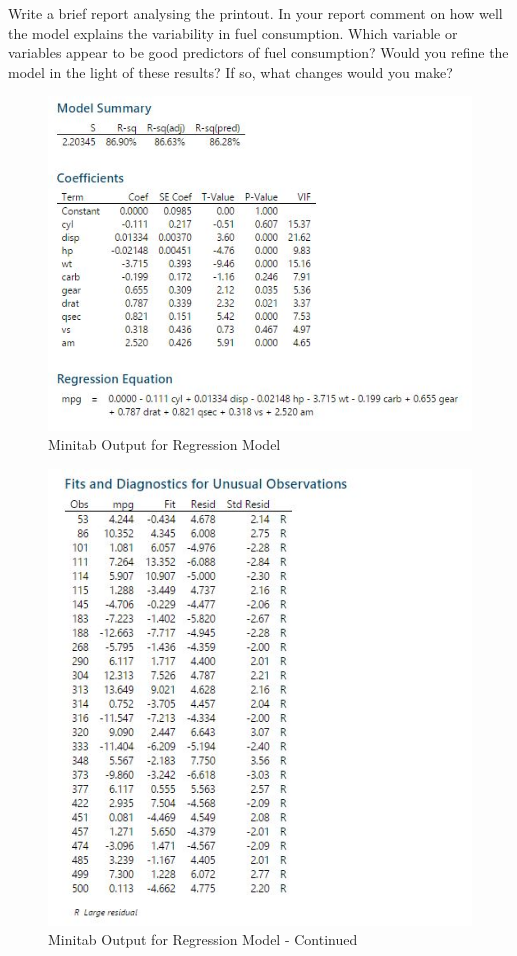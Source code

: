 \documentclass[a4paper,12pt]{article}
\begin{document}
\noindent Write a brief report analysing the printout. In your report comment on how well
the model explains the variability in fuel consumption.
Which variable or variables appear to be good predictors of fuel consumption?
Would you refine the model in the light of these results? If so, what changes
would you make?
\newpage
\begin{figure}[h!]
\centering
\includegraphics[width=1.1\linewidth]{images/Repeat2017-Q5-Output}
\caption{Minitab Output for Regression Model}
\label{fig:Repeat2017-Q5-Output}
\end{figure}
\newpage
\begin{figure}[h!]
\centering
\includegraphics[width=1.1\linewidth]{images/Repeat2017-Q5-Output2}
\caption{Minitab Output for Regression Model - Continued}
\label{fig:Repeat2017-Q5-Output2}
\end{figure}
\end{document}
